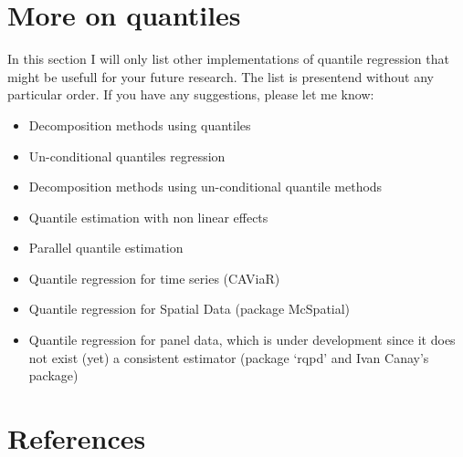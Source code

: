 \documentclass[]{book}
\providecommand{\tightlist}{%
  \setlength{\itemsep}{0pt}\setlength{\parskip}{0pt}}
\begin{document}
\section{More on quantiles}\label{more-on-quantiles}

In this section I will only list other implementations of quantile
regression that might be usefull for your future research. The list is
presentend without any particular order. If you have any suggestions,
please let me know:

\begin{itemize}
\tightlist
\item
  Decomposition methods using quantiles
  \citep{machado2005counterfactual}
\item
  Un-conditional quantiles regression \citep{firpo2009unconditional}
\item
  Decomposition methods using un-conditional quantile methods
  \citep{firpo2018decomposing}
\item
  Quantile estimation with non linear effects
\item
  Parallel quantile estimation
\item
  Quantile regression for time series (CAViaR)
\item
  Quantile regression for Spatial Data (package McSpatial)
\item
  Quantile regression for panel data, which is under development since
  it does not exist (yet) a consistent estimator (package `rqpd' and
  Ivan Canay's package)
\end{itemize}

\section{References}\label{references}


\end{document}
